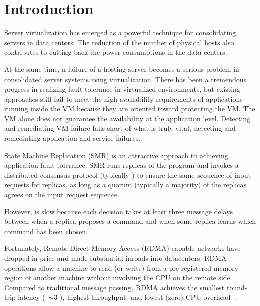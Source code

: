 \section{Introduction} \label{sec:intro}


Server virtualization has emerged as a powerful technique for consolidating servers in 
data centers. The reduction of the number of physical hosts also contributes to cutting 
back the power consumptions in the data centers.


At the same time, a failure of a hosting server becomes a serious problem in consolidated 
server systems using virtualization. There has been a tremendous progress in realizing fault 
tolerance in virtualized environments, but existing approaches still fail to meet the high 
availability requirements of applications running inside the VM because they are oriented 
toward protecting the VM. The VM alone does not guarantee the availability at the application 
level. Detecting and remediating VM failure falls short of what is truly vital, detecting and 
remediating application and service failures.

State Machine Replication (SMR) is an attractive approach to achieving application fault tolerance. 
SMR runs replicas of the program and invokes a distributed consensus protocol 
(typically \paxos) to ensure the same sequence of input requests for replicas, as long as a 
quorum (typically a majority) of the replicas agrees on the input request sequence.

However, \paxos is slow because each decision takes at least three message delays between when 
a replica proposes a command and when some replica learns which command has been chosen.

Fortunately, Remote Direct Memory Access (RDMA)-capable networks have dropped in price and made 
substantial inroads into datacenters. RDMA operations allow a machine to read (or write) from a 
pre-registered memory region of another machine without involving the CPU on the remote side. 
Compared to traditional message passing, RDMA achieves the smallest round-trip latency 
(~$\sim$3 \us), highest throughput, and lowest (zero) CPU overhead~\cite{pilaf:usenix14}.

